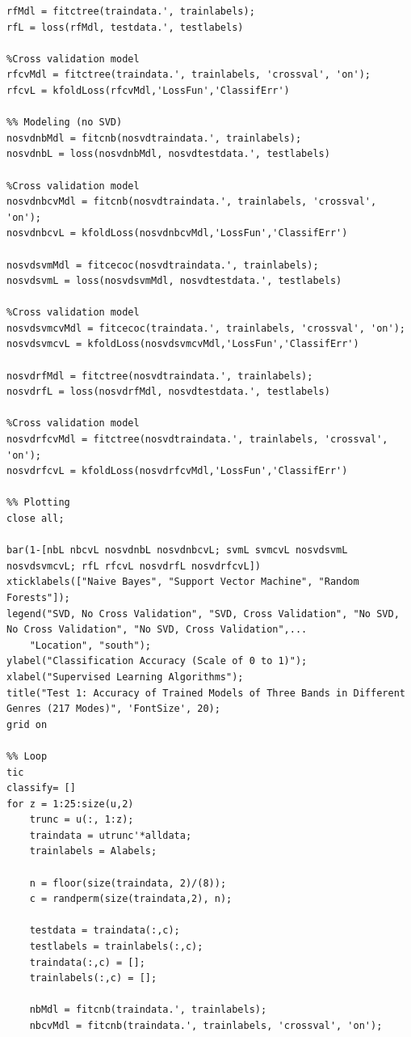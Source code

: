 \documentclass{article}
\begin{document}
\begin{lstlisting}[style=Matlab-editor]
rfMdl = fitctree(traindata.', trainlabels);
rfL = loss(rfMdl, testdata.', testlabels)

%Cross validation model
rfcvMdl = fitctree(traindata.', trainlabels, 'crossval', 'on');
rfcvL = kfoldLoss(rfcvMdl,'LossFun','ClassifErr')

%% Modeling (no SVD)
nosvdnbMdl = fitcnb(nosvdtraindata.', trainlabels);
nosvdnbL = loss(nosvdnbMdl, nosvdtestdata.', testlabels)

%Cross validation model
nosvdnbcvMdl = fitcnb(nosvdtraindata.', trainlabels, 'crossval', 'on');
nosvdnbcvL = kfoldLoss(nosvdnbcvMdl,'LossFun','ClassifErr')

nosvdsvmMdl = fitcecoc(nosvdtraindata.', trainlabels);
nosvdsvmL = loss(nosvdsvmMdl, nosvdtestdata.', testlabels)

%Cross validation model
nosvdsvmcvMdl = fitcecoc(traindata.', trainlabels, 'crossval', 'on');
nosvdsvmcvL = kfoldLoss(nosvdsvmcvMdl,'LossFun','ClassifErr')

nosvdrfMdl = fitctree(nosvdtraindata.', trainlabels);
nosvdrfL = loss(nosvdrfMdl, nosvdtestdata.', testlabels)

%Cross validation model
nosvdrfcvMdl = fitctree(nosvdtraindata.', trainlabels, 'crossval', 'on');
nosvdrfcvL = kfoldLoss(nosvdrfcvMdl,'LossFun','ClassifErr')

%% Plotting
close all;

bar(1-[nbL nbcvL nosvdnbL nosvdnbcvL; svmL svmcvL nosvdsvmL nosvdsvmcvL; rfL rfcvL nosvdrfL nosvdrfcvL])
xticklabels(["Naive Bayes", "Support Vector Machine", "Random Forests"]);
legend("SVD, No Cross Validation", "SVD, Cross Validation", "No SVD, No Cross Validation", "No SVD, Cross Validation",...
    "Location", "south");
ylabel("Classification Accuracy (Scale of 0 to 1)"); xlabel("Supervised Learning Algorithms");
title("Test 1: Accuracy of Trained Models of Three Bands in Different Genres (217 Modes)", 'FontSize', 20);
grid on

%% Loop
tic
classify= []
for z = 1:25:size(u,2)
    trunc = u(:, 1:z);
    traindata = utrunc'*alldata;
    trainlabels = Alabels;
    
    n = floor(size(traindata, 2)/(8));
    c = randperm(size(traindata,2), n);
    
    testdata = traindata(:,c);
    testlabels = trainlabels(:,c);
    traindata(:,c) = [];
    trainlabels(:,c) = [];
    
    nbMdl = fitcnb(traindata.', trainlabels);
    nbcvMdl = fitcnb(traindata.', trainlabels, 'crossval', 'on');


\end{lstlisting}
\end{document}
